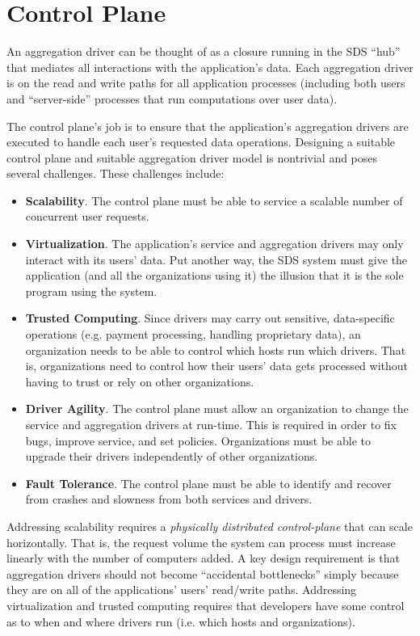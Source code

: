 \section{Control Plane}

An aggregation driver can be thought of as a closure running in the SDS ``hub''
that mediates all interactions with the application's data.  Each aggregation
driver is on the read and write paths for all application processes (including
both users and ``server-side'' processes that run computations over user data).

The control plane's job is to ensure that the application's aggregation
drivers are executed to handle each user's requested data operations.
Designing a suitable control plane and suitable aggregation driver
model is nontrivial and poses several challenges.  These challenges include:

\begin{itemize}
    \item \textbf{Scalability}.  The control plane must be able to service a
    scalable number of concurrent user requests. 
    \item \textbf{Virtualization}.  The application's service and aggregation
    drivers may only interact with its users' data.  Put another way,
      the SDS system must give the application (and all the organizations using
      it) the illusion that it is the sole program using the system.
    \item \textbf{Trusted Computing}.  Since drivers may carry out sensitive,
    data-specific operations (e.g. payment processing, handling proprietary
    data), an organization needs to be able to control which hosts run which
    drivers.  That is, organizations need to
    control how their users' data gets processed without having to trust or rely
    on other organizations.
    \item \textbf{Driver Agility}.  The control plane must allow an organization to
    change the service and aggregation drivers at run-time.
    This is required in order to fix bugs, improve service, and set policies.
    Organizations must be able to upgrade their drivers independently of other organizations.
    \item \textbf{Fault Tolerance}.  The control plane must be able to identify
    and recover from crashes and slowness from both services and drivers.
\end{itemize}

Addressing scalability requires a \emph{physically distributed control-plane} that can
scale horizontally.  That is, the request volume the system can process must
increase linearly with the number of computers added.
A key design requirement is that aggregation drivers should not become ``accidental
bottlenecks'' simply because they are on all of the applications' users' read/write paths.
Addressing virtualization and trusted computing requires that developers have some
control as to when and where drivers run (i.e. which hosts and organizations).

